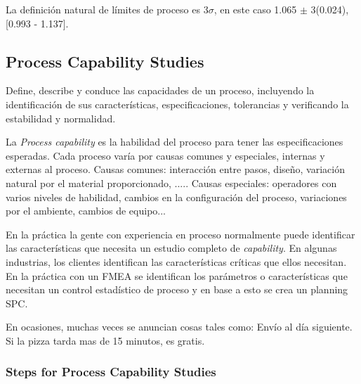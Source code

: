 \documentclass[]{article}
\begin{document}
La definición natural de límites de proceso es 3$\sigma$, en este caso 1.065 $\pm$ 3(0.024), [0.993 - 1.137].

\subsection{Process Capability Studies}

Define, describe y conduce las capacidades de un proceso, incluyendo la identificación de sus características, especificaciones, tolerancias y verificando la estabilidad y normalidad.

La \textit{Process capability} es la habilidad del proceso para tener las especificaciones esperadas. Cada proceso varía por causas comunes y especiales, internas y externas al proceso. Causas comunes: interacción entre pasos, diseño, variación natural por el material proporcionado, ..... Causas especiales: operadores con varios niveles de habilidad, cambios en la configuración del proceso, variaciones por el ambiente, cambios de equipo...

En la práctica la gente con experiencia en proceso normalmente puede identificar las características que necesita un estudio completo de \textit{capability}. En algunas industrias, los clientes identifican las características críticas que ellos necesitan. En la práctica con un FMEA se identifican los parámetros o características que necesitan un control estadístico de proceso y en base a esto se crea un planning SPC. 

En ocasiones, muchas veces se anuncian cosas tales como: Envío al día siguiente. Si la pizza tarda mas de 15 minutos, es gratis. 

\subsubsection{Steps for Process Capability Studies}
\end{document}
